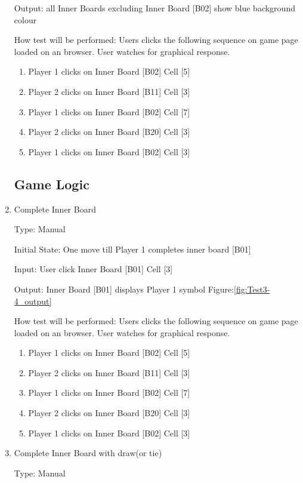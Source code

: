 \documentclass[12pt, titlepage]{article}
\begin{document}
\begin{enumerate}
Output:  all Inner Boards excluding Inner Board [B02] show blue background colour
					
How test will be performed: Users clicks the following sequence on game page
loaded on an browser. User watches for graphical response.
\begin{enumerate}
	\item Player 1 clicks on Inner Board [B02] Cell [5]
	\item Player 2 clicks on Inner Board [B11] Cell [3]
	\item Player 1 clicks on Inner Board [B02] Cell [7]
	\item Player 2 clicks on Inner Board [B20] Cell [3]
	\item Player 1 clicks on Inner Board [B02] Cell [3]
\end{enumerate}


\subsection{Game Logic}

\item{Complete Inner Board\\}

Type: Manual
					
Initial State: One move till Player 1 completes inner board [B01]
					
Input: User click Inner Board [B01] Cell [3] 
					
Output:  Inner Board [B01] displays Player 1 symbol Figure:\ref{fig:Test3-4_output}
					
How test will be performed: Users clicks the following sequence on game page
loaded on an browser. User watches for graphical response.
\begin{enumerate}
	\item Player 1 clicks on Inner Board [B02] Cell [5]
	\item Player 2 clicks on Inner Board [B11] Cell [3]
	\item Player 1 clicks on Inner Board [B02] Cell [7]
	\item Player 2 clicks on Inner Board [B20] Cell [3]
	\item Player 1 clicks on Inner Board [B02] Cell [3]
\end{enumerate}

\item{Complete Inner Board with draw(or tie) \\}

Type: Manual
					

\end{enumerate}
\end{document}
